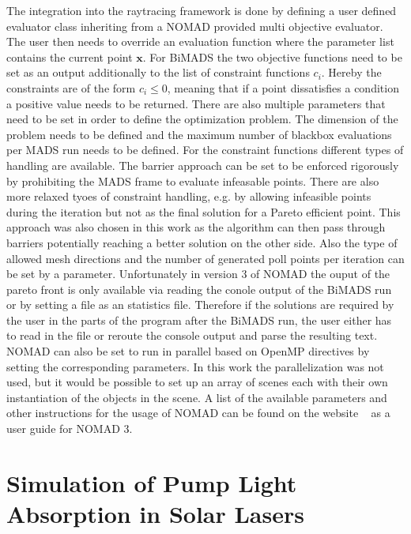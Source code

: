 \documentclass[a4paper,10pt]{article}
\renewcommand{\vec}[1]{\mathbf{#1}}
\begin{document}
    The integration into the raytracing framework is done by defining
    a user defined evaluator class inheriting from a NOMAD provided
    multi objective evaluator.
    The user then needs to override an evaluation function where the
    parameter list contains the current point $\vec{x}$.
    For BiMADS the two objective functions need to be set as an output
    additionally to the list of constraint functions $c_i$.
    Hereby the constraints are of the form $c_i \leq 0$, meaning that
    if a point dissatisfies a condition a positive value needs to be
    returned.       
    There are also multiple parameters that need to be set in order to
    define the optimization problem.
    The dimension of the problem needs to be defined and the maximum number
    of blackbox evaluations per MADS run needs to be defined.
    For the constraint functions different types of handling are available.
    The barrier approach can be set to be enforced rigorously by 
    prohibiting the MADS frame to evaluate infeasable points.
    There are also more relaxed tyoes of constraint handling, e.g. by allowing
    infeasible points during the iteration but not as the final solution
    for a Pareto efficient point.
    This approach was also chosen in this work as the algorithm can then pass
    through barriers potentially reaching a better solution on the other side.
    Also the type of allowed mesh directions and the number of 
    generated poll points per iteration can be set by a parameter.
    Unfortunately in version 3 of NOMAD the ouput of the pareto front
    is only available via reading the conole output of the BiMADS run
    or by setting a file as an statistics file.
    Therefore if the solutions are required by the user in the
    parts of the program after the BiMADS run, the user either has to
    read in the file or reroute the console output and parse the resulting
    text.
    NOMAD can also be set to run in parallel based on OpenMP directives by
    setting the corresponding parameters.
    In this work the parallelization was not used, but it would be possible
    to set up an array of scenes each with their own instantiation of
    the objects in the scene.
    A list of the available parameters and other instructions for 
    the usage of NOMAD can be found on the website ~\cite{nomad_website} as
    a user guide for NOMAD 3.
    

    \section{Simulation of Pump Light Absorption in Solar Lasers} \label{sec:setup}
    
\end{document}
